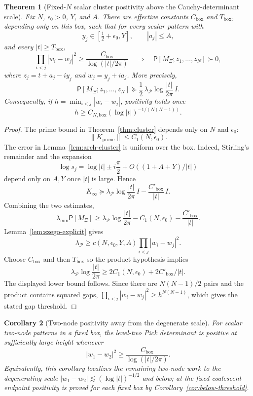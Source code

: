 \documentclass[11pt]{amsart}
\newtheorem{theorem}{Theorem}[section]
\newtheorem{corollary}[theorem]{Corollary}
\theoremstyle{definition}
\theoremstyle{remark}
\theoremstyle{definition}
\newcommand{\half}{\tfrac{1}{2}}
\begin{document}
\begin{theorem}[Fixed-$N$ scalar cluster positivity above the Cauchy-determinant scale]\label{thm:cluster-quantitative}
Fix $N$, $\epsilon_0>0$, $Y$, and $A$.  There are effective constants
$C_{\mathrm{box}}$ and $T_{\mathrm{box}}$, depending only on this box, such that for every scalar
pattern with
\[
   y_j\in[\half+\epsilon_0,Y],\qquad |a_j|\le A,
\]
and every $|t|\ge T_{\mathrm{box}}$,
\[
   \prod_{i<j}|w_i-w_j|^2
   \ge
   \frac{C_{\mathrm{box}}}{\log(|t|/2\pi)}
   \quad\Longrightarrow\quad
   \mathsf P[M_\Xi;z_1,\ldots,z_N]\succ0,
\]
where $z_j=t+a_j-iy_j$ and $w_j=y_j+ia_j$.  More precisely,
\[
   \mathsf P[M_\Xi;z_1,\ldots,z_N]
   \succeq
   \frac12\,\lambda_{\mathcal P}\log\frac{|t|}{2\pi}\,I.
\]
Consequently, if $h=\min_{i<j}|w_i-w_j|$, positivity holds once
\[
   h\ge C_{N,\mathrm{box}}(\log|t|)^{-1/(N(N-1))}.
\]
\end{theorem}

\begin{proof}
The prime bound in Theorem~\ref{thm:cluster} depends only on $N$ and $\epsilon_0$:
\[
   \|K_{\mathrm{prime}}\|\le C_1(N,\epsilon_0).
\]
The error in Lemma~\ref{lem:arch-cluster} is uniform over the box.  Indeed, Stirling's remainder and
the expansion
\[
   \log s_j=\log|t|\pm i\frac\pi2+O((1+A+Y)/|t|)
\]
depend only on $A,Y$ once $|t|$ is large.  Hence
\[
   K_\infty
   \succeq
   \lambda_{\mathcal P}\log\frac{|t|}{2\pi}\,I
   -
   \frac{C'_{\mathrm{box}}}{|t|}\,I.
\]
Combining the two estimates,
\[
   \lambda_{\min}\mathsf P[M_\Xi]
   \ge
   \lambda_{\mathcal P}\log\frac{|t|}{2\pi}
   -
   C_1(N,\epsilon_0)
   -
   \frac{C'_{\mathrm{box}}}{|t|}.
\]
Lemma~\ref{lem:szego-explicit} gives
\[
   \lambda_{\mathcal P}
   \ge
   c(N,\epsilon_0,Y,A)\prod_{i<j}|w_i-w_j|^2.
\]
Choose $C_{\mathrm{box}}$ and then $T_{\mathrm{box}}$ so the product hypothesis implies
\[
   \lambda_{\mathcal P}\log\frac{|t|}{2\pi}
   \ge
   2C_1(N,\epsilon_0)+2C'_{\mathrm{box}}/|t|.
\]
The displayed lower bound follows.  Since there are $N(N-1)/2$ pairs and the product contains squared
gaps, $\prod_{i<j}|w_i-w_j|^2\ge h^{N(N-1)}$, which gives the stated gap threshold.
\end{proof}

\begin{corollary}[Two-node positivity away from the degenerate scale]\label{cor:H7-nondegenerate}
For scalar two-node patterns in a fixed box, the level-two Pick determinant is positive at sufficiently
large height whenever
\[
   |w_1-w_2|^2\ge\frac{C_{\mathrm{box}}}{\log(|t|/2\pi)}.
\]
Equivalently, this corollary localizes the remaining two-node work to the degenerating scale
$|w_1-w_2|\lesssim(\log|t|)^{-1/2}$ and below; at the fixed coalescent endpoint positivity is proved
for each fixed box by Corollary~\ref{cor:below-threshold}.
\end{corollary}
\end{document}
